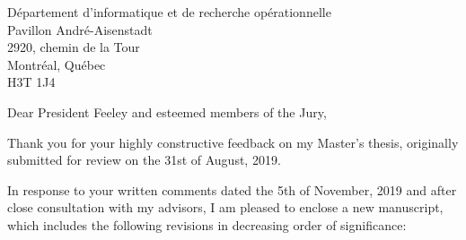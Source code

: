 \documentclass{letter}
\begin{document}
    \begin{letter}{D\'epartement d'informatique et de recherche op\'erationnelle \\ Pavillon Andr\'e-Aisenstadt \\ 2920, chemin de la Tour \\ Montr\'eal, Qu\'ebec \\ H3T 1J4}
        \opening{Dear President Feeley and esteemed members of the Jury,}
        Thank you for your highly constructive feedback on my Master's thesis, originally submitted for review on the 31st of August, 2019.

        In response to your written comments dated the 5th of November, 2019 and after close consultation with my advisors, I am pleased to enclose a new manuscript, which includes the following revisions in decreasing order of significance:


\end{letter}
\end{document}
